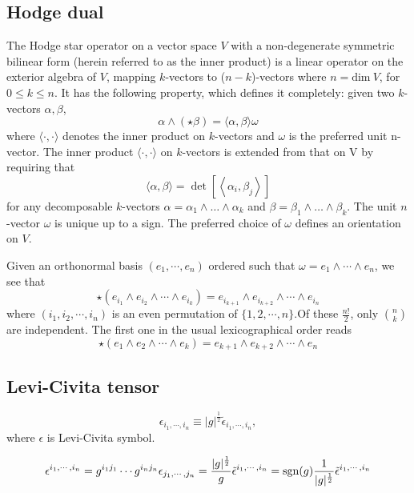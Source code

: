 \subsection{Hodge dual}
\begin{newdef}
The Hodge star operator on a vector space $V$ with a non-degenerate symmetric bilinear form (herein referred to as the inner product) is a linear operator on the exterior algebra of $V$, mapping $k$-vectors to ($n-k$)-vectors where $n = \text{dim} \ V$, for $ 0 \leq k \leq n$. It has the following property, which defines it completely: given two $k$-vectors $\alpha,\beta$,
\[\alpha \wedge (\star \beta )=\langle \alpha ,\beta \rangle \omega\]
where $\langle \cdot ,\cdot \rangle$ denotes the inner product on $k$-vectors and $\omega$ is the preferred unit n-vector.
The inner product $\langle \cdot ,\cdot \rangle$ on $k$-vectors is extended from that on V by requiring that
\[\langle \alpha ,\beta \rangle =\det \left[\left\langle \alpha _{i},\beta _{j}\right\rangle \right]\]
for any decomposable $k$-vectors $\alpha =\alpha _{1}\wedge \dots \wedge \alpha _{k}$ and $\beta =\beta _{1}\wedge \dots \wedge \beta _{k}$. The unit $n$-vector $\omega$ is unique up to a sign. The preferred choice of $\omega$ defines an orientation on $V$.
\end{newdef}
\noindent
Given an orthonormal basis $(e_{1},\cdots ,e_{n})$ ordered such that $\omega =e_{1}\wedge \cdots \wedge e_{n}$, we see that
\[\star (e_{i_{1}}\wedge e_{i_{2}}\wedge \cdots \wedge e_{i_{k}})=e_{i_{k+1}}\wedge e_{i_{k+2}}\wedge \cdots \wedge e_{i_{n}}\]
where $(i_{1},i_{2},\cdots ,i_{n})$ is an even permutation of $\{1,2,\cdots,n\}$.Of these $\frac{n!}{2}$, only $n \choose k$ are independent. The first one in the usual lexicographical order reads
\[\star (e_{1}\wedge e_{2}\wedge \cdots \wedge e_{k})=e_{k+1}\wedge e_{k+2}\wedge \cdots \wedge e_{n}\]

\subsection{Levi-Civita tensor}
\begin{newdef}
\[\epsilon_{i_1,\cdots,i_n} \equiv |g|^{\frac{1}{2}} \tilde{\epsilon}_{i_1,\cdots,i_n} ,\]
where $\epsilon$ is Levi-Civita symbol.
\end{newdef} 
\begin{newprop}
\[\epsilon^{i_1,\cdots,i_n} = g^{i_1j_1} \cdots g^{i_nj_n} \epsilon_{j_1,\cdots,j_n} = \frac{|g|^{\frac{1}{2}}}{g} \tilde{\epsilon}^{i_1,\cdots,i_n} = {\rm sgn}(g) \frac{1}{|g|^{\frac{1}{2}}} \tilde{\epsilon}^{i_1,\cdots,i_n}\]
\end{newprop}


